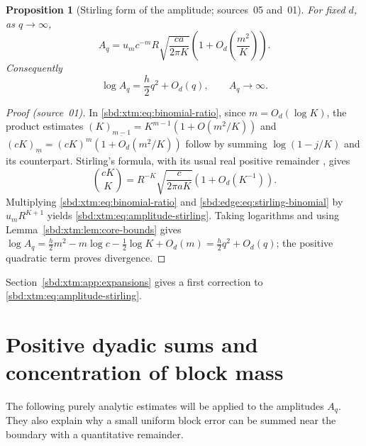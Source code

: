 \documentclass[11pt,a4paper]{article}
\newtheorem{proposition}[theorem]{Proposition}
\theoremstyle{definition}
\newcommand{\fall}[2]{(#1)_{\underline{#2}}}
\begin{document}
\begin{proposition}[Stirling form of the amplitude; sources~05 and~01]\label{sbd:edge:prop:amplitude}
For fixed $d$, as $q\to\infty$,
\begin{equation}\label{sbd:xtm:eq:amplitude-stirling}
 A_q=u_mc^{-m}R\sqrt{\frac{ca}{2\pi K}}
             \left(1+O_d\left(\frac{m^2}{K}\right)\right).
\end{equation}
Consequently
\begin{equation}\label{sbd:edge:eq:amplitude-log}
 \log A_q=\frac{h}{2}q^2+O_d(q),
 \qquad A_q\longrightarrow\infty.
\end{equation}
\end{proposition}
\begin{proof}[Proof (source~01)]
In \eqref{sbd:xtm:eq:binomial-ratio}, since $m=O_d(\log K)$, the product
estimates $\fall K{m-1}=K^{m-1}(1+O(m^2/K))$ and
$\fall{cK}m=(cK)^m(1+O_d(m^2/K))$ follow by summing $\log(1-j/K)$ and its
counterpart. Stirling's formula, with its usual real positive remainder
\cite{dlmf}, gives
\begin{equation}\label{sbd:edge:eq:stirling-binomial}
 \binom{cK}{K}
 =R^{-K}\sqrt{\frac{c}{2\pi aK}}
 \left(1+O_d(K^{-1})\right).
\end{equation}
Multiplying \eqref{sbd:xtm:eq:binomial-ratio} and
\eqref{sbd:edge:eq:stirling-binomial} by $u_mR^{K+1}$ yields
\eqref{sbd:xtm:eq:amplitude-stirling}. Taking logarithms and using
Lemma~\ref{sbd:xtm:lem:core-bounds} gives
$\log A_q=\tfrac h2m^2-m\log c-\tfrac12\log K+O_d(m)=\tfrac h2q^2+O_d(q)$;
the positive quadratic term proves divergence.
\end{proof}
Section~\ref{sbd:xtm:app:expansions} gives a first correction to
\eqref{sbd:xtm:eq:amplitude-stirling}.

\section{Positive dyadic sums and concentration of block mass}
\label{sbd:xtm:sec:dyadic-sums}

The following purely analytic estimates will be applied to the amplitudes
$A_q$. They also explain why a small uniform block error can be summed near
the boundary with a quantitative remainder.
\end{document}

